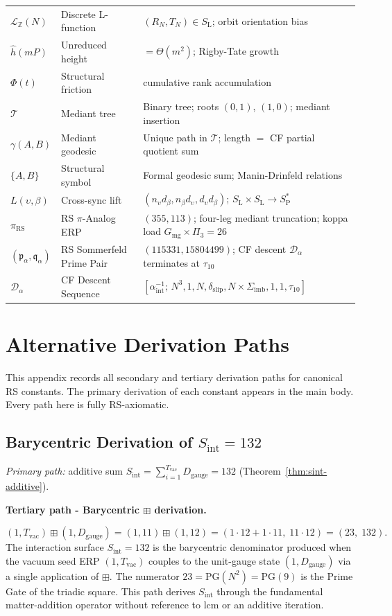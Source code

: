 \documentclass[11pt, letterpaper]{article}
\newcommand{\SL}{S_{\mathrm{L}}}
\newcommand{\SPs}{S_{\mathrm{P}}^{*}}
\newcommand{\bplus}{\boxplus}
\newcommand{\Dg}{D_{\mathrm{gauge}}}
\newcommand{\Sint}{S_{\mathrm{int}}}
\newcommand{\LQ}{\mathcal{L}_{\mathbb{Z}}}
\newcommand{\Sigimb}{\Sigma_{\mathrm{imb}}}
\newcommand{\PG}{\mathrm{PG}}
\newcommand{\Gmg}{G_{\mathrm{mg}}}
\newcommand{\dslip}{\delta_{\mathrm{slip}}}
\newcommand{\tauX}{\tau_{10}}
\newcommand{\Pithree}{\Pi_3}
\newcommand{\aSC}{\alpha^{-1}_{\mathrm{int}}}
\newcommand{\piRS}{\pi_{\mathrm{RS}}}
\newcommand{\pa}{\mathfrak{p}_\alpha}
\newcommand{\qa}{\mathfrak{q}_\alpha}
\newcommand{\Da}{\mathcal{D}_\alpha}
\theoremstyle{definition}
\theoremstyle{plain}
\begin{document}
\begin{longtable}{L{2.2cm} L{5.5cm} L{5.5cm}}
$\LQ(N)$ & Discrete L-function &
  $(R_N,T_N)\in\SL$; orbit orientation bias \\
$\hat{h}(mP)$ & Unreduced height & $=\Theta(m^2)$; Rigby-Tate growth \\
$\Phi(t)$ & Structural friction & cumulative rank accumulation \\
$\mathcal{T}$ & Mediant tree &
  Binary tree; roots $(0,1)$, $(1,0)$; mediant insertion \\
$\gamma(A,B)$ & Mediant geodesic &
  Unique path in $\mathcal{T}$; length $=$ CF partial quotient sum \\
$\{A,B\}$ & Structural symbol &
  Formal geodesic sum; Manin-Drinfeld relations \\
$L(\upsilon,\beta)$ & Cross-sync lift &
  $(n_\upsilon d_\beta,n_\beta d_\upsilon,d_\upsilon d_\beta)$;
  $\SL\times\SL\to\SPs$ \\
$\piRS$ & RS $\pi$-Analog ERP &
  $(355,113)$; four-leg mediant truncation;
  koppa load $\Gmg\times\Pithree=26$ \\
$(\pa,\qa)$ & RS Sommerfeld Prime Pair &
  $(115331,15804499)$; CF descent $\Da$ terminates at $\tauX$ \\
$\Da$ & CF Descent Sequence &
  $[\aSC;\,N^3,1,N,\dslip,N\times\Sigimb,1,1,\tauX]$ \\
\end{longtable}

\newpage


\appendix
\section{Alternative Derivation Paths}\label{app:alt-paths}

This appendix records all secondary and tertiary derivation paths for
canonical RS constants.  The primary derivation of each constant appears in
the main body.  Every path here is fully RS-axiomatic.

\subsection{Barycentric Derivation of $\Sint=132$}\label{app:sint-bary}

\noindent\textit{Primary path:} additive sum
$\Sint=\sum_{i=1}^{T_{\mathrm{vac}}}\Dg=132$
(Theorem~\ref{thm:sint-additive}).

\medskip
\noindent\textbf{Tertiary path - Barycentric $\bplus$ derivation.}

\begin{rsbox}
\[
(1,T_{\mathrm{vac}})\bplus(1,\Dg)
= (1,11)\bplus(1,12)
= (1\cdot 12+1\cdot 11,\;11\cdot 12)
= (23,\;132).
\]
The interaction surface $\Sint=132$ is the barycentric denominator produced
when the vacuum seed ERP $(1,T_{\mathrm{vac}})$ couples to the unit-gauge
state $(1,\Dg)$ via a single application of $\bplus$.  The numerator
$23=\PG(N^2)=\PG(9)$ is the Prime Gate of the triadic square.  This path
derives $\Sint$ through the fundamental matter-addition operator without
reference to $\mathrm{lcm}$ or an additive iteration.
\end{rsbox}
\end{document}
